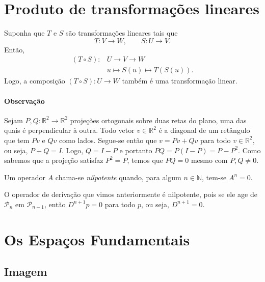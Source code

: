 \section{Produto de transformações lineares}

\begin{defi}
Suponha que $T$ e $S$ são transformações lineares tais que
\begin{equation*}
  T: V\to W, \qquad S: U\to V.
\end{equation*}
Então,
\begin{align*}
  (T\circ S) :& U\to V\to W\\
      & u \mapsto S(u) \mapsto T(S(u)).
\end{align*}
Logo, a composição $(T\circ S):U\to W$ também é uma transformação linear.
\end{defi}

\paragraph*{Observação}
  Sejam $P,Q:{\mathbb{R}}^2 \rightarrow {\mathbb{R}}^2$ projeções ortogonais sobre duas retas do plano, uma das quais é perpendicular à outra. Todo vetor $v\in {\mathbb{R}}^2$ é a diagonal de um retângulo que tem $Pv$ e $Qv$ como lados. Segue-se então que $v = Pv+Qv$ para todo $v\in {\mathbb{R}}^2$, ou seja, $P+Q=I$. Logo, $Q=I-P$ e portanto $PQ=P(I-P)=P-P^2$. Como sabemos que a projeção satisfaz $P^2=P$, temos que $PQ=0$ mesmo com $P,Q\ne 0$. 

\begin{defi}
    Um operador $A$ chama-se \emph{nilpotente} quando, para algum $n\in {\mathbb{N}}$, tem-se $A^n=0$.
\end{defi}

\begin{exemplo}
    O operador de derivação que vimos anteriormente é nilpotente, pois se ele age de ${\mathcal{P}}_{n}$ em ${\mathcal{P}}_{n-1}$, então $D^{n+1}p=0$ para todo $p$, ou seja, $D^{n+1}=0$.
\end{exemplo}

\section{Os Espaços Fundamentais}

\subsection*{Imagem}

